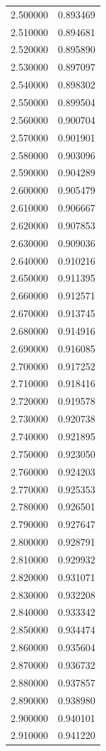 \begin{tabular}{rr}
2.500000 & 0.893469 \\
2.510000 & 0.894681 \\
2.520000 & 0.895890 \\
2.530000 & 0.897097 \\
2.540000 & 0.898302 \\
2.550000 & 0.899504 \\
2.560000 & 0.900704 \\
2.570000 & 0.901901 \\
2.580000 & 0.903096 \\
2.590000 & 0.904289 \\
2.600000 & 0.905479 \\
2.610000 & 0.906667 \\
2.620000 & 0.907853 \\
2.630000 & 0.909036 \\
2.640000 & 0.910216 \\
2.650000 & 0.911395 \\
2.660000 & 0.912571 \\
2.670000 & 0.913745 \\
2.680000 & 0.914916 \\
2.690000 & 0.916085 \\
2.700000 & 0.917252 \\
2.710000 & 0.918416 \\
2.720000 & 0.919578 \\
2.730000 & 0.920738 \\
2.740000 & 0.921895 \\
2.750000 & 0.923050 \\
2.760000 & 0.924203 \\
2.770000 & 0.925353 \\
2.780000 & 0.926501 \\
2.790000 & 0.927647 \\
2.800000 & 0.928791 \\
2.810000 & 0.929932 \\
2.820000 & 0.931071 \\
2.830000 & 0.932208 \\
2.840000 & 0.933342 \\
2.850000 & 0.934474 \\
2.860000 & 0.935604 \\
2.870000 & 0.936732 \\
2.880000 & 0.937857 \\
2.890000 & 0.938980 \\
2.900000 & 0.940101 \\
2.910000 & 0.941220 \\

\end{tabular}
